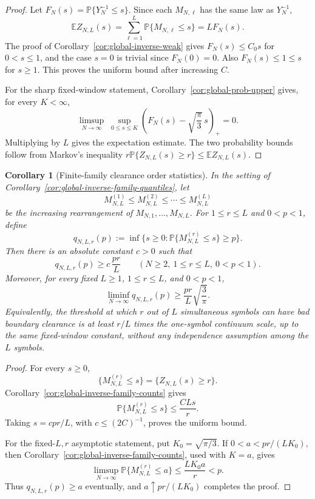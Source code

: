 \documentclass[11pt]{amsart}
\numberwithin{equation}{section}
\newtheorem{corollary}[theorem]{Corollary}
\theoremstyle{definition}
\theoremstyle{remark}
\newcommand{\Prob}{\mathbb P}
\newcommand{\Exp}{\mathbb E}
\begin{document}
\begin{proof}
Let \(F_N(s)=\Prob\{Y_N^{-1}\le s\}\).  Since each \(M_{N,\ell}\) has the same
law as \(Y_N^{-1}\),
\[
  \Exp Z_{N,L}(s)=\sum_{\ell=1}^L \Prob\{M_{N,\ell}\le s\}=L F_N(s).
\]
The proof of Corollary~\ref{cor:global-inverse-weak} gives \(F_N(s)\le C_0s\)
for \(0<s\le1\), and the case \(s=0\) is trivial since \(F_N(0)=0\).  Also
\(F_N(s)\le1\le s\) for \(s\ge1\).  This proves the uniform bound after
increasing \(C\).

For the sharp fixed-window statement, Corollary~\ref{cor:global-prob-upper}
gives, for every \(K<\infty\),
\[
  \limsup_{N\to\infty}\;
  \sup_{0\le s\le K}
  \left(F_N(s)-\sqrt{\frac{\pi}{3}}\,s\right)_+
  =0 .
\]
Multiplying by \(L\) gives the expectation estimate.  The two probability
bounds follow from Markov's inequality
\(r\Prob\{Z_{N,L}(s)\ge r\}\le \Exp Z_{N,L}(s)\).
\end{proof}

\begin{corollary}[Finite-family clearance order statistics]
\label{cor:global-inverse-family-order-quantiles}
In the setting of Corollary~\ref{cor:global-inverse-family-quantiles}, let
\[
  M_{N,L}^{(1)}\le M_{N,L}^{(2)}\le\cdots\le M_{N,L}^{(L)}
\]
be the increasing rearrangement of \(M_{N,1},\ldots,M_{N,L}\).  For
\(1\le r\le L\) and \(0<p<1\), define
\[
  q_{N,L,r}(p):=
  \inf\{s\ge0:\Prob\{M_{N,L}^{(r)}\le s\}\ge p\}.
\]
Then there is an absolute constant \(c>0\) such that
\[
  q_{N,L,r}(p)\ge c\,\frac{pr}{L}
  \qquad(N\ge2,\ 1\le r\le L,\ 0<p<1).
\]
Moreover, for every fixed \(L\ge1\), \(1\le r\le L\), and \(0<p<1\),
\[
  \liminf_{N\to\infty}q_{N,L,r}(p)
  \ge \frac{pr}{L}\sqrt{\frac{3}{\pi}}.
\]
Equivalently, the threshold at which \(r\) out of \(L\) simultaneous symbols
can have bad boundary clearance is at least \(r/L\) times the one-symbol
continuum scale, up to the same fixed-window constant, without any independence
assumption among the \(L\) symbols.
\end{corollary}

\begin{proof}
For every \(s\ge0\),
\[
  \{M_{N,L}^{(r)}\le s\}=\{Z_{N,L}(s)\ge r\}.
\]
Corollary~\ref{cor:global-inverse-family-counts} gives
\[
  \Prob\{M_{N,L}^{(r)}\le s\}\le \frac{CLs}{r}.
\]
Taking \(s=cp r/L\), with \(c\le(2C)^{-1}\), proves the uniform bound.

For the fixed-\(L,r\) asymptotic statement, put \(K_0=\sqrt{\pi/3}\).  If
\(0<a<pr/(LK_0)\), then Corollary~\ref{cor:global-inverse-family-counts}, used
with \(K=a\), gives
\[
  \limsup_{N\to\infty}\Prob\{M_{N,L}^{(r)}\le a\}
  \le \frac{LK_0a}{r}
  <p .
\]
Thus \(q_{N,L,r}(p)\ge a\) eventually, and
\(a\uparrow pr/(LK_0)\) completes the proof.
\end{proof}
\end{document}
